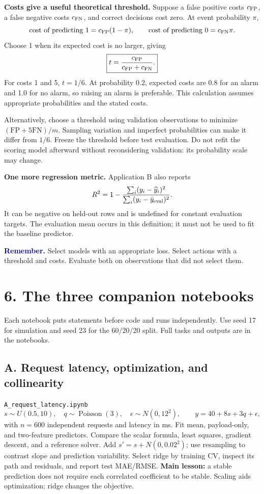 \documentclass[11pt,a4paper]{article}
\newcommand{\code}[1]{\texttt{\small #1}}
\newcommand{\idea}[1]{\textcolor{navy}{\textbf{Remember.}} #1}
\begin{document}
\textbf{Costs give a useful theoretical threshold.}
Suppose a false positive costs $c_{\rm FP}$, a false negative costs
$c_{\rm FN}$, and correct decisions cost zero. At event probability $\pi$,
\[
\text{cost of predicting 1}=c_{\rm FP}(1-\pi),\qquad
\text{cost of predicting 0}=c_{\rm FN}\pi.
\]
Choose 1 when its expected cost is no larger, giving
\[
\boxed{t=\frac{c_{\rm FP}}{c_{\rm FP}+c_{\rm FN}}.}
\]
For costs 1 and 5, $t=1/6$. At probability 0.2, expected costs are 0.8 for
an alarm and 1.0 for no alarm, so raising an alarm is preferable. This calculation
assumes appropriate probabilities and the stated costs.

Alternatively, choose a threshold using validation observations to minimize
$(\mathrm{FP}+5\mathrm{FN})/m$. Sampling variation and imperfect probabilities
can make it differ from $1/6$. Freeze the threshold before test evaluation.
Do not refit the scoring model afterward without reconsidering validation:
its probability scale may change.

\textbf{One more regression metric.} Application B also reports
\[
R^2=1-\frac{\sum_i(y_i-\widehat y_i)^2}
{\sum_i(y_i-\bar y_{\rm eval})^2}.
\]
It can be negative on held-out rows and is undefined for constant evaluation
targets. The evaluation mean occurs in this definition; it must not be used
to fit the baseline predictor.

\idea{Select models with an appropriate loss. Select actions with a threshold
and costs. Evaluate both on observations that did not select them.}

\newpage
\section*{6. The three companion notebooks}
Each notebook puts statements before code and runs independently. Use seed 17
for simulation and seed 23 for the 60/20/20 split. Full tasks and outputs are
in the notebooks.

\subsection*{A. Request latency, optimization, and collinearity}
\code{A\_request\_latency.ipynb}
\[
s\sim U(0.5,10),\quad q\sim\operatorname{Poisson}(3),\quad
\epsilon\sim N(0,12^2),\qquad y=40+8s+3q+\epsilon,
\]
with $n=600$ independent requests and latency in ms.
Fit mean, payload-only, and two-feature predictors. Compare the scalar formula,
least squares, gradient descent, and a reference solver. Add $s'=s+N(0,0.02^2)$;
use resampling to contrast slope and prediction variability. Select ridge by
training CV, inspect its path and residuals, and report test MAE/RMSE.
\textbf{Main lesson:} a stable prediction does not require each correlated
coefficient to be stable. Scaling aids optimization; ridge changes the objective.
\end{document}
